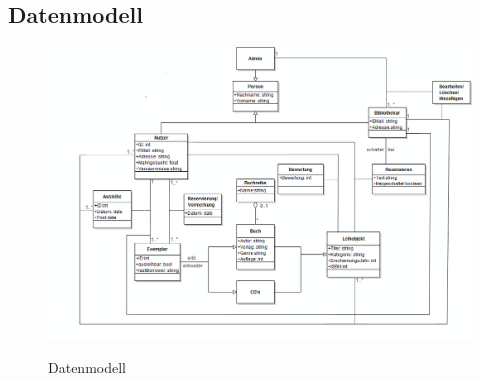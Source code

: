 \documentclass[fontsize=12pt,paper=a4,twoside]{scrartcl}
\begin{document}
\subsection{Datenmodell} 
\begin{figure}
	[H] \caption{Datenmodell} 
	\includegraphics[width=1
	\textwidth]{UML_Black1.png} \label{datenmodell} 
\end{figure}
\end{document}
